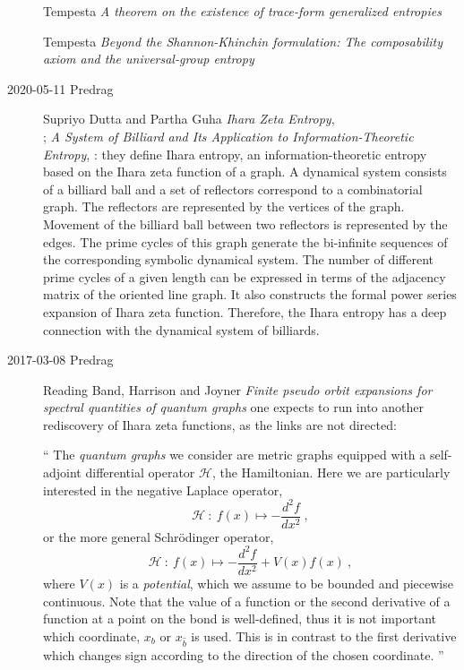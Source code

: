 \begin{description}
{Tempesta}
{\em A theorem on the existence of trace-form generalized entropies}

Tempesta {\em Beyond the {Shannon-Khinchin} formulation:
{The} composability axiom and the universal-group entropy}

\item[2020-05-11 Predrag]
Supriyo Dutta and Partha Guha
{\em Ihara Zeta Entropy},\\
;
{\em A System of Billiard and Its Application to Information-Theoretic Entropy},
:
they define Ihara entropy,
an information-theoretic entropy based on the Ihara zeta function of
a graph. A dynamical system consists
of a billiard ball and a set of reflectors correspond to a combinatorial
graph.  The reflectors are represented by the vertices of the graph.
Movement of the billiard ball between two reflectors is represented by the
edges.  The prime cycles of this graph generate the bi-infinite
sequences of the corresponding symbolic dynamical system.  The number
of different prime cycles of a given length can be expressed in terms of
the adjacency matrix of the oriented line graph.  It also constructs the
formal power  series  expansion  of Ihara zeta function.  Therefore,  the
Ihara entropy has a deep connection with the dynamical system of
billiards.

\item[2017-03-08 Predrag]
Reading Band, Harrison and Joyner
{\em Finite pseudo orbit expansions for spectral quantities of quantum graphs}
one expects to run into another rediscovery of Ihara zeta functions, as the
links are not directed:

``
The \emph{quantum graphs} we consider are metric graphs equipped with a self-adjoint
differential operator $\mathcal{H}$, the Hamiltonian.
Here we are particularly interested in the negative Laplace operator,
\begin{equation}
\mathcal{H}\ :\ f(x)\mapsto-\frac{d^{2}f}{dx^{2}} \ , \label{E:lap_op}
\end{equation}
 or the more general Schr\"odinger operator,
\begin{equation}
\mathcal{H}\ :\ f(x)\mapsto-\frac{d^{2}f}{dx^{2}}+V(x)f(x) \ ,\label{E:schrod}
\end{equation}
 where $V(x)$ is a \emph{potential}, which we assume to be bounded
and piecewise continuous. Note that the value of a function or the
second derivative of a function at a point on the bond is well-defined,
thus it is not important which coordinate, $x_{b}$ or $x_{\hat{b}}$
is used. This is in contrast to the first derivative which changes
sign according to the direction of the chosen coordinate.
''


\end{description}
